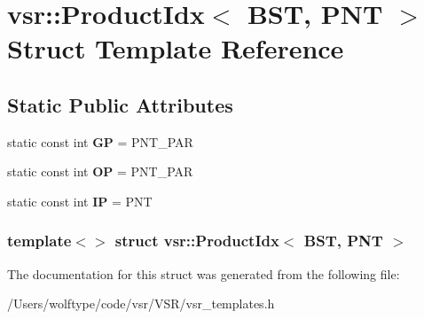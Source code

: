 \hypertarget{structvsr_1_1_product_idx_3_01_b_s_t_00_01_p_n_t_01_4}{\section{vsr\-:\-:Product\-Idx$<$ B\-S\-T, P\-N\-T $>$ Struct Template Reference}
\label{structvsr_1_1_product_idx_3_01_b_s_t_00_01_p_n_t_01_4}
}
\subsection*{Static Public Attributes}
\begin{DoxyCompactItemize}
\item 
\hypertarget{structvsr_1_1_product_idx_3_01_b_s_t_00_01_p_n_t_01_4_a4fcb94e72d2f1f4a8a1b5e9ad2f8fe28}{static const int {\bfseries G\-P} = P\-N\-T\-\_\-\-P\-A\-R}\label{structvsr_1_1_product_idx_3_01_b_s_t_00_01_p_n_t_01_4_a4fcb94e72d2f1f4a8a1b5e9ad2f8fe28}

\item 
\hypertarget{structvsr_1_1_product_idx_3_01_b_s_t_00_01_p_n_t_01_4_ab6721d1228ace62ba50312c6786fbead}{static const int {\bfseries O\-P} = P\-N\-T\-\_\-\-P\-A\-R}\label{structvsr_1_1_product_idx_3_01_b_s_t_00_01_p_n_t_01_4_ab6721d1228ace62ba50312c6786fbead}

\item 
\hypertarget{structvsr_1_1_product_idx_3_01_b_s_t_00_01_p_n_t_01_4_a395758728d53e83b268e495a89d22cf8}{static const int {\bfseries I\-P} = P\-N\-T}\label{structvsr_1_1_product_idx_3_01_b_s_t_00_01_p_n_t_01_4_a395758728d53e83b268e495a89d22cf8}

\end{DoxyCompactItemize}
\subsubsection*{template$<$$>$ struct vsr\-::\-Product\-Idx$<$ B\-S\-T, P\-N\-T $>$}



The documentation for this struct was generated from the following file\-:\begin{DoxyCompactItemize}
\item 
/\-Users/wolftype/code/vsr/\-V\-S\-R/vsr\-\_\-templates.\-h\end{DoxyCompactItemize}
